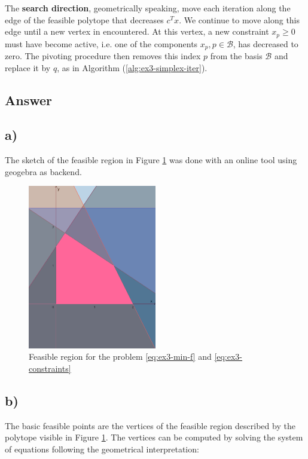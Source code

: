 \documentclass[unicode,11pt,a4paper,oneside,numbers=endperiod,openany]{scrartcl}
\begin{document}
The \textbf{search direction}, geometrically speaking, 
move each iteration along the edge of the feasible polytope that decreases \( c^T x \).
We continue to move along this edge until a new vertex in encountered.
At this vertex, a new constraint \( x_p \geq 0 \) must have become active,
i.e. one of the components \( x_p, p \in \mathcal{B} \), has decreased to zero.
The pivoting procedure then removes this index \( p \) from the basis \( \mathcal{B} \)
and replace it by \( q \), as in Algorithm (\ref{alg:ex3-simplex-iter}).

\subsection{Answer}

\subsection*{a)}

The sketch of the feasible region in Figure \ref{fig:feasible-region}
was done with an online tool using geogebra as backend.

\begin{figure}[htbp]
    \centering
    \includegraphics[width=0.5\textwidth]{./figures/ex3-feasible-region.png}
    \caption{Feasible region for the problem \ref{eq:ex3-min-f} and \ref{eq:ex3-constraints}}
    \label{fig:feasible-region}
\end{figure}

\subsection*{b)}

The basic feasible points are the vertices of the feasible region described by the polytope
visible in Figure \ref{fig:feasible-region}.
The vertices can be computed by solving the system of equations
following the geometrical interpretation:
\end{document}
